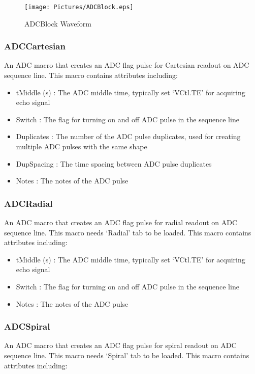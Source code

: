 \documentclass{book}%
\begin{document}
\begin{figure}[htbp]
	\centering
		\texttt{[image: Pictures/ADCBlock.eps]}
	\caption{ADCBlock Waveform}
	\label{fig:ADCBlock}
\end{figure}


\subsubsection{ADCCartesian}

An ADC macro that creates an ADC flag pulse for Cartesian readout on ADC sequence line. This macro contains attributes including:

\begin{itemize}
	\item tMiddle (s) : The ADC middle time, typically set `VCtl.TE' for acquiring echo signal
	\item Switch : The flag for turning on and off ADC pulse in the sequence line
	\item Duplicates : The number of the ADC pulse duplicates, used for creating multiple ADC pulses with the same shape
	\item DupSpacing : The time spacing between ADC pulse duplicates
	\item Notes : The notes of the ADC pulse 
\end{itemize}

\subsubsection{ADCRadial}

An ADC macro that creates an ADC flag pulse for radial readout on ADC sequence line. This macro needs `Radial' tab to be loaded. This macro contains attributes including:

\begin{itemize}
	\item tMiddle (s) : The ADC middle time, typically set `VCtl.TE' for acquiring echo signal
	\item Switch : The flag for turning on and off ADC pulse in the sequence line
	\item Notes : The notes of the ADC pulse 
\end{itemize}

\subsubsection{ADCSpiral}

An ADC macro that creates an ADC flag pulse for spiral readout on ADC sequence line. This macro needs `Spiral' tab to be loaded. This macro contains attributes including:
\end{document}
